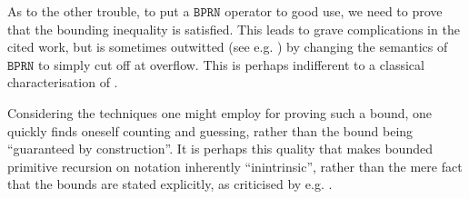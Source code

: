 As to the other trouble, to put a $\mathtt{BPRN}$ operator to good use, we need
to prove that the bounding inequality is satisfied.  This leads to grave
complications in the cited work, but is sometimes outwitted (see e.g.
\cite{cook-urquhart-1993}) by changing the semantics of $\mathtt{BPRN}$ to
simply cut off at overflow. This is perhaps indifferent to a classical
characterisation of \FPTIME{}.

Considering the techniques one might employ for proving such a bound, one
quickly finds oneself counting and guessing, rather than the bound being
``guaranteed by construction''.  It is perhaps this quality that makes bounded
primitive recursion on notation inherently ``inintrinsic'', rather than the
mere fact that the bounds are stated explicitly, as criticised by e.g.
\cite{hofmann-2000a}.
